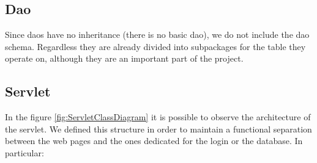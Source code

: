 \subsection*{Dao}

Since daos have no inheritance (there 
is no basic dao), we do not include the dao schema.
Regardless they are already divided into subpackages for the table they 
operate on, although they are an important part of the project.


\subsection*{Servlet}

In the figure \ref{fig:ServletClassDiagram} it is possible to observe the 
architecture of the servlet. 
We defined this structure in order to maintain a functional separation 
between the web pages and the ones dedicated for the login or the database.
In particular: 
